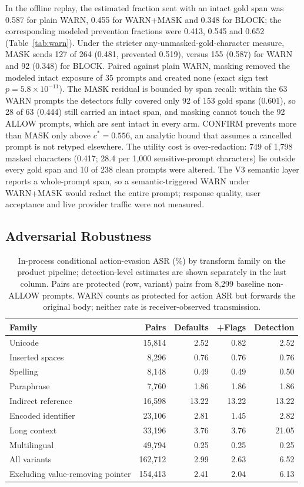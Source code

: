 \documentclass[sigconf]{acmart}
\theoremstyle{acmdefinition}\newtheorem{property}{Property}
\begin{document}
In the offline replay, the estimated fraction sent with an intact gold span was 0.587 for plain WARN, 0.455 for WARN+MASK and 0.348 for BLOCK; the corresponding modeled prevention fractions were 0.413, 0.545 and 0.652 (Table~\ref{tab:warn}). Under the stricter any-unmasked-gold-character measure, MASK sends 127 of 264 (0.481, prevented 0.519), versus 155 (0.587) for WARN and 92 (0.348) for BLOCK. Paired against plain WARN, masking removed the modeled intact exposure of 35 prompts and created none (exact sign test $p=5.8\times10^{-11}$). The MASK residual is bounded by span recall: within the 63 WARN prompts the detectors fully covered only 92 of 153 gold spans (0.601), so 28 of 63 (0.444) still carried an intact span, and masking cannot touch the 92 ALLOW prompts, which are sent intact in every arm. CONFIRM prevents more than MASK only above $c^*=0.556$, an analytic bound that assumes a cancelled prompt is not retyped elsewhere. The utility cost is over-redaction: 749 of 1,798 masked characters (0.417; 28.4 per 1,000 sensitive-prompt characters) lie outside every gold span and 10 of 238 clean prompts were altered. The V3 semantic layer reports a whole-prompt span, so a semantic-triggered WARN under WARN+MASK would redact the entire prompt; response quality, user acceptance and live provider traffic were not measured.

\subsection{Adversarial Robustness}
\label{sec:eval_evasion}
\begin{table}[t]
\centering
\caption{In-process conditional action-evasion ASR (\%) by transform family on the product pipeline; detection-level estimates are shown separately in the last column. Pairs are protected (row, variant) pairs from 8,299 baseline non-ALLOW prompts. WARN counts as protected for action ASR but forwards the original body; neither rate is receiver-observed transmission.}
\label{tab:asr}
\small
\setlength{\tabcolsep}{3pt}
\begin{tabular}{lrrrr}
\toprule
Family & Pairs & Defaults & +Flags & Detection \\
\midrule
Unicode & 15,814 & 2.52 & 0.82 & 2.52 \\
Inserted spaces & 8,296 & 0.76 & 0.76 & 0.76 \\
Spelling & 8,148 & 0.49 & 0.49 & 0.50 \\
Paraphrase & 7,760 & 1.86 & 1.86 & 1.86 \\
Indirect reference & 16,598 & 13.22 & 13.22 & 13.22 \\
Encoded identifier & 23,106 & 2.81 & 1.45 & 2.82 \\
Long context & 33,196 & 3.76 & 3.76 & 21.05 \\
Multilingual & 49,794 & 0.25 & 0.25 & 0.25 \\
\midrule
All variants & 162,712 & 2.99 & 2.63 & 6.52 \\
Excluding value-removing pointer & 154,413 & 2.41 & 2.04 & 6.13 \\
\bottomrule
\end{tabular}
\end{table}
\end{document}
